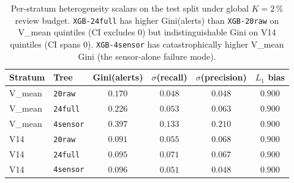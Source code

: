 \documentclass{article}
\begin{document}
\begin{table}[t]
\centering
\small
\caption{Per-stratum heterogeneity scalars on the test split under
global $K{=}2\,\%$ review budget. \texttt{XGB-24full} has higher
Gini(alerts) than \texttt{XGB-20raw} on V\_mean quintiles (CI excludes 0)
but indistinguishable Gini on V14 quintiles (CI spans 0).
\texttt{XGB-4sensor} has catastrophically higher V\_mean Gini (the
sensor-alone failure mode).}
\label{tab:p8-subgroup-fairness}
\begin{tabular}{llcccc}
\toprule
Stratum & Tree & Gini(alerts) & $\sigma$(recall) & $\sigma$(precision) & $L_1$ bias \\
\midrule
V\_mean & \texttt{20raw}  & $0.170$ & $0.048$ & $0.048$ & $0.900$ \\
V\_mean & \texttt{24full} & $0.226$ & $0.053$ & $0.063$ & $0.900$ \\
V\_mean & \texttt{4sensor}& $0.397$ & $0.133$ & $0.210$ & $0.900$ \\
V14     & \texttt{20raw}  & $0.091$ & $0.055$ & $0.068$ & $0.900$ \\
V14     & \texttt{24full} & $0.095$ & $0.071$ & $0.067$ & $0.900$ \\
V14     & \texttt{4sensor}& $0.096$ & $0.051$ & $0.048$ & $0.900$ \\
\bottomrule
\end{tabular}
\end{table}
\end{document}
